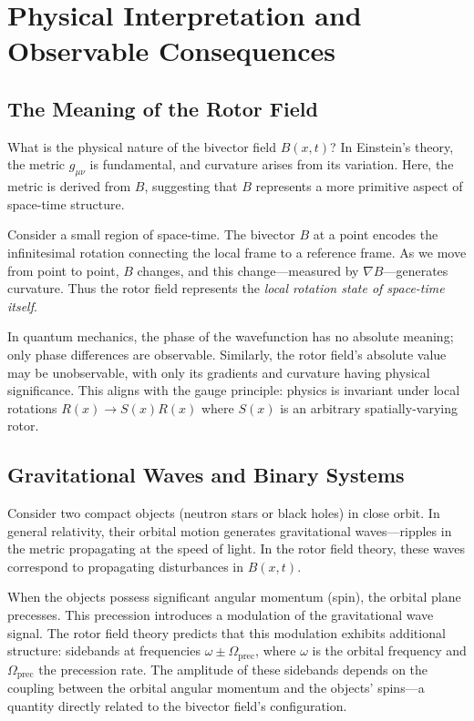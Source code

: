 \documentclass[11pt,a4paper]{article}
\numberwithin{equation}{section}
\theoremstyle{plain}
\theoremstyle{definition}
\theoremstyle{remark}
\begin{document}
\section{Physical Interpretation and Observable Consequences}
\label{sec:physical}

\subsection{The Meaning of the Rotor Field}

What is the physical nature of the bivector field $B(x,t)$? In Einstein's theory, the metric $g_{\mu\nu}$ is fundamental, and curvature arises from its variation. Here, the metric is derived from $B$, suggesting that $B$ represents a more primitive aspect of space-time structure.

Consider a small region of space-time. The bivector $B$ at a point encodes the infinitesimal rotation connecting the local frame to a reference frame. As we move from point to point, $B$ changes, and this change---measured by $\nabla B$---generates curvature. Thus the rotor field represents the \emph{local rotation state of space-time itself}.

In quantum mechanics, the phase of the wavefunction has no absolute meaning; only phase differences are observable. Similarly, the rotor field's absolute value may be unobservable, with only its gradients and curvature having physical significance. This aligns with the gauge principle: physics is invariant under local rotations $R(x) \to S(x)R(x)$ where $S(x)$ is an arbitrary spatially-varying rotor.

\subsection{Gravitational Waves and Binary Systems}

Consider two compact objects (neutron stars or black holes) in close orbit. In general relativity, their orbital motion generates gravitational waves---ripples in the metric propagating at the speed of light. In the rotor field theory, these waves correspond to propagating disturbances in $B(x,t)$.

When the objects possess significant angular momentum (spin), the orbital plane precesses. This precession introduces a modulation of the gravitational wave signal. The rotor field theory predicts that this modulation exhibits additional structure: sidebands at frequencies $\omega \pm \Omega_{\mathrm{prec}}$, where $\omega$ is the orbital frequency and $\Omega_{\mathrm{prec}}$ the precession rate. The amplitude of these sidebands depends on the coupling between the orbital angular momentum and the objects' spins---a quantity directly related to the bivector field's configuration.
\end{document}
